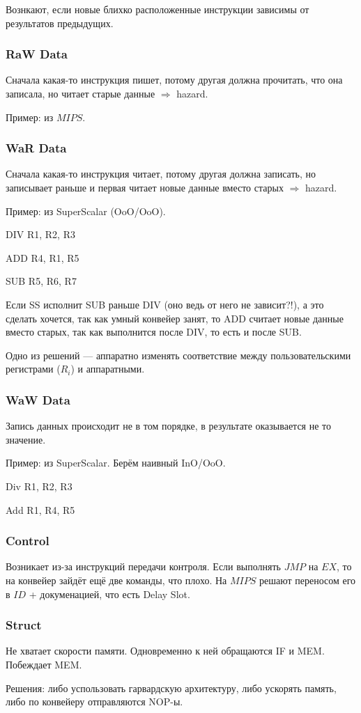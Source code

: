 \documentclass[12pt, a4paper]{article}
\begin{document}
Вознкают, если новые блихко расположенные инструкции зависимы от результатов предыдущих.

\subsubsection{RaW Data}

Сначала какая-то инструкция пишет, потому другая должна прочитать, что она записала, но читает старые данные $\Rightarrow$ hazard.

Пример: из $MIPS$.



\subsubsection{WaR Data}

Сначала какая-то инструкция читает, потому другая должна записать, но записывает раньше и первая читает новые данные вместо старых $\Rightarrow$ hazard.

Пример: из SuperScalar (OoO/OoO).

DIV R1, R2, R3

ADD R4, R1, R5

SUB R5, R6, R7

Если SS исполнит SUB раньше DIV (оно ведь от него не зависит?!), а это сделать хочется, так как умный конвейер занят,
то ADD считает новые данные вместо старых, так как выполнится после DIV, то есть и после SUB.

Одно из решений — аппаратно изменять соответствие между пользовательскими регистрами ($R_i$) 
и аппаратными.


\subsubsection{WaW Data}

Запись данных происходит не в том порядке, в результате оказывается не то значение.

Пример: из SuperScalar.
Берём наивный InO/OoO.

Div R1, R2, R3

Add R1, R4, R5



\subsubsection{Control}

Возникает из-за инструкций передачи контроля.
Если выполнять $JMP$ на $EX$, то на конвейер зайдёт ещё две команды, что плохо.
На $MIPS$ решают переносом его в $ID$ + докуменацией, что есть Delay Slot.


\subsubsection{Struct}

Не хватает скорости памяти. Одновременно к ней обращаются IF и MEM.
Побеждает MEM. 

Решения: либо успользовать гарвардскую архитектуру, либо ускорять память, либо по конвейеру отправляются NOP-ы.
\end{document}
